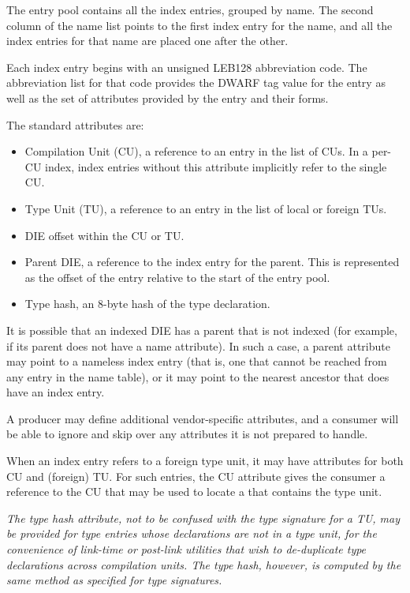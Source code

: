 The entry pool contains all the index entries, grouped by name. The
second column of the name list points to the first index entry for the
name, and all the index entries for that name are placed one after the
other.

Each index entry begins with an unsigned LEB128 abbreviation code.
The  abbreviation list for that code provides the DWARF tag value for
the entry as well as the set of attributes provided by the entry and
their forms.

The standard attributes are:
\begin{itemize}
\item Compilation Unit (CU), a reference to an entry in the list of
    CUs. In a per-CU index, index entries without this attribute
    implicitly refer to the single CU.

\item Type Unit (TU), a reference to an entry in the list of local
    or foreign TUs.

\item DIE offset within the CU or TU.

\item Parent DIE, a reference to the index entry for the parent.
    This is represented as the offset of the entry relative to
    the start of the entry pool.

\item Type hash, an 8-byte hash of the type declaration.
\end{itemize}

It is possible that an indexed DIE has a parent that is not
indexed (for example, if its parent does not have a name attribute). In
such a case, a parent attribute may point to a nameless index
entry (that is, one that cannot be reached from any entry in the
name table), or it may point to the nearest ancestor that does
have an index entry.

A producer may define additional vendor-specific attributes, 
and a consumer will be able to ignore and skip over any attributes 
it is not prepared to handle.

When an index entry refers to a foreign type unit, it may have
attributes for both CU and (foreign) TU. For such entries, the CU
attribute gives the consumer a reference to the CU that may be used to
locate a \splitDWARFobjectfile{} that contains the type unit.

\bb
\textit{The type hash attribute, not to be confused with the type signature
for a TU, may be provided for type entries whose declarations are not
in a type unit, for the convenience of link-time or post-link
utilities that wish to de-duplicate type declarations across
compilation units. The type hash, however, is computed by the
same method as specified for type signatures.}
\eb

